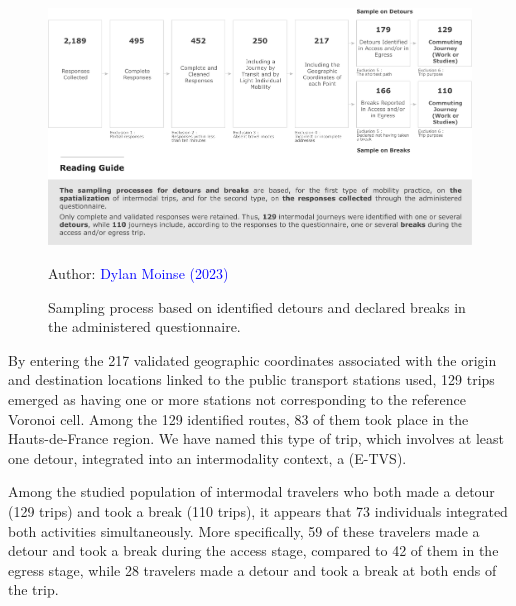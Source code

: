 \begin{refsegment}
    \begin{figure}[h!]\vspace*{4pt}
        \caption{Sampling process based on identified detours and declared breaks in the administered questionnaire.}
        \label{fig-chap5:echantillonnage-detours-pauses}
        \centerline{\includegraphics[width=1\columnwidth]{src/Figures/Chap-5/EN_Detours_Echantillonnage.pdf}}
        \vspace{5pt}
        \begin{flushright}\scriptsize{
        Author: \textcolor{blue}{Dylan Moinse (2023)}
        }\end{flushright}
    \end{figure}

By entering the 217 validated geographic coordinates associated with the origin and destination locations linked to the public transport stations used, 129 trips emerged as having one or more stations not corresponding to the reference Voronoi cell. Among the 129 identified routes, 83 of them took place in the Hauts-de-France region. We have named this type of trip, which involves at least one detour, integrated into an \gls{intermodality} context, a  (\acrfull{E-TVS}).%

Among the studied population of intermodal travelers who both made a detour (129 trips) and took a break (110 trips), it appears that 73 individuals integrated both activities simultaneously. More specifically, 59 of these travelers made a detour and took a break during the access stage, compared to 42 of them in the egress stage, while 28 travelers made a detour and took a break at both ends of the trip.%


\end{refsegment}
